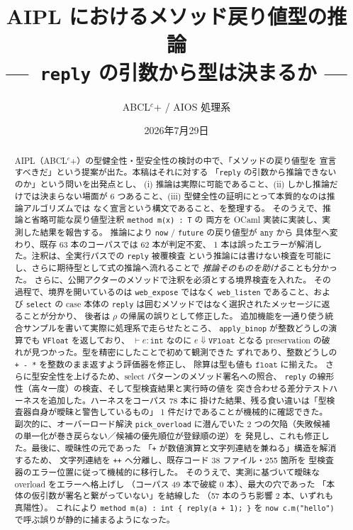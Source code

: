 \documentclass[11pt,a4paper]{ltjsarticle}
\title{AIPL におけるメソッド戻り値型の推論\\
{\large ---\ \texttt{reply} の引数から型は決まるか ---}}
\author{ABCL$^{c}$+ / AIOS 処理系}
\date{2026年7月29日}
\theoremstyle{definition}
\theoremstyle{remark}
\newcommand{\ty}[1]{\ensuremath{\mathtt{#1}}}
\begin{document}
\maketitle

\begin{abstract}
AIPL（ABCL$^{c}$+）の型健全性・型安全性の検討の中で、「メソッドの戻り値型を
宣言すべきだ」という提案が出た。本稿はそれに対する
「\texttt{reply} の引数から推論できないのか」という問いを出発点とし、
(i) 推論は実際に可能であること、(ii) しかし推論だけでは決まらない場面が
6 つあること、(iii) 型健全性の証明にとって本質的なのは推論アルゴリズムでは
なく宣言という構文であること、を整理する。
そのうえで、推論と省略可能な戻り値型注釈 \texttt{method m(x) : T} の
両方を OCaml 実装に実装し、実測した結果を報告する。
推論により \texttt{now} / \texttt{future} の戻り値型が \ty{any} から
具体型へ変わり、既存 63 本のコーパスでは 62 本が判定不変、
1 本は誤ったエラーが解消した。注釈は、全実行パスでの \texttt{reply} 被覆検査
という推論には書けない検査を可能にし、さらに期待型として式の推論へ流れることで
\emph{推論そのものを助ける}ことも分かった。
さらに、公開アクターのメソッドで注釈を必須とする境界検査を入れた。
その過程で、境界を開いているのは \texttt{web\_expose} ではなく
\texttt{web\_listen} であること、および \texttt{select} の case 本体の
\texttt{reply} は囲むメソッドではなく選択されたメッセージに返ることが分かり、
後者は $\rho$ の帰属の誤りとして修正した。
追加機能を一通り使う統合サンプルを書いて実際に処理系で走らせたところ、
\texttt{apply\_binop} が整数どうしの演算でも \texttt{VFloat} を返しており、
$\vdash e : \ty{int}$ なのに $e \Downarrow \ty{VFloat}$ となる
preservation の破れが見つかった。型を精密にしたことで初めて観測できた
ずれであり、整数どうしの \texttt{+ - *} を整数のまま返すよう評価器を修正し、
除算は型も値も \ty{float} に揃えた。
さらに型安全性を上げるため、select パターンのメソッド署名への照合、
\texttt{reply} の線形性（高々一度）の検査、そして型検査結果と実行時の値を
突き合わせる差分テストハーネスを追加した。ハーネスをコーパス 78 本に
掛けた結果、残る食い違いは「型検査器自身が曖昧と警告しているもの」
1 件だけであることが機械的に確認できた。
副次的に、オーバーロード解決 \texttt{pick\_overload} に潜んでいた
2 つの欠陥（失敗候補の単一化が巻き戻らない／候補の優先順位が登録順の逆）を
発見し、これも修正した。最後に、曖昧性の元であった
「\texttt{+} が数値演算と文字列連結を兼ねる」構造を解消するため、
文字列連結を \texttt{++} へ分離し、既存コード 38 ファイル・255 箇所を
型検査器のエラー位置に従って機械的に移行した。
そのうえで、実測に基づいて曖昧な overload をエラーへ格上げし
（コーパス 49 本で破綻 0 本）、最大の穴であった
「本体の仮引数が署名と繋がっていない」を結線した
（57 本のうち影響 2 本、いずれも真陽性）。
これにより \texttt{method m(a) : int \{ reply(a + 1); \}} を
\texttt{now c.m("hello")} で呼ぶ誤りが静的に捕まるようになった。
\end{abstract}
\end{document}
